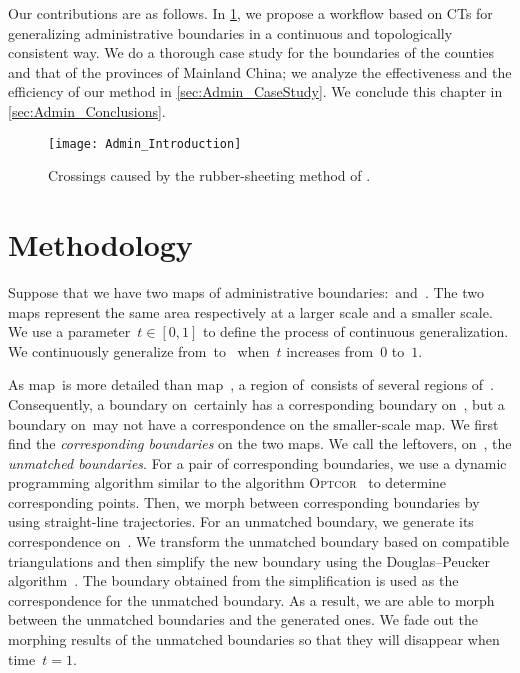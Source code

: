 Our contributions are as follows.
In \sect\ref{sec:Admin_OverallAlgorithm},
we propose a workflow based on CTs 
for generalizing administrative boundaries 
in a continuous and topologically consistent way. 
We do a thorough case study for the boundaries of 
the counties and that of the provinces of Mainland China;  
we analyze the effectiveness and the efficiency of
our method in \sect\ref{sec:Admin_CaseStudy}.  
We conclude this chapter in \sect\ref{sec:Admin_Conclusions}.

\begin{figure}[tb]
	\centering
	\texttt{[image: Admin\_Introduction]}
	\caption{Crossings caused by the rubber-sheeting method of 
	\textcite{Doytsher2001}.}
	\label{fig:Admin_Rubbersheeting}
\end{figure}

\section{Methodology}
\label{sec:Admin_OverallAlgorithm}

Suppose that we have two maps  
of administrative boundaries:~\ml and~\ms.
The two maps represent the same area 
respectively at a larger scale and a smaller scale. 
We use a parameter~$t\in[0,1]$ 
to define the process of continuous generalization.
We continuously generalize from~\ml to~\ms
when~$t$ increases from~$0$ to~$1$.


As map~\ml is more detailed than map~\ms, 
a region of~\ms consists of several regions of~\ml. 
Consequently, a boundary on~\ms certainly 
has a corresponding boundary on~\ml, 
but a boundary on~\ml may not
have a correspondence on the smaller-scale map. 
We first find the \emph{corresponding boundaries} on the two maps.
We call the leftovers, on~\ml, the \emph{unmatched boundaries}. 
For a pair of corresponding boundaries, we
use a dynamic programming algorithm similar to the algorithm 
\textsc{Optcor}~\parencite{Noellenburg2008} to determine 
corresponding points.
Then, we morph between corresponding boundaries 
by using straight-line trajectories. 
For an unmatched boundary, we generate its correspondence on~\ms.
We transform the unmatched boundary based on compatible triangulations 
and then simplify the new boundary using the 
Douglas--Peucker algorithm~\parencite{Douglas1973}.
The boundary obtained from the simplification is used as 
the correspondence for the unmatched boundary.
As a result, we are able to morph 
between the unmatched boundaries and the generated ones. 
We fade out the morphing results of the unmatched boundaries
so that they will disappear when time~$t=1$.

